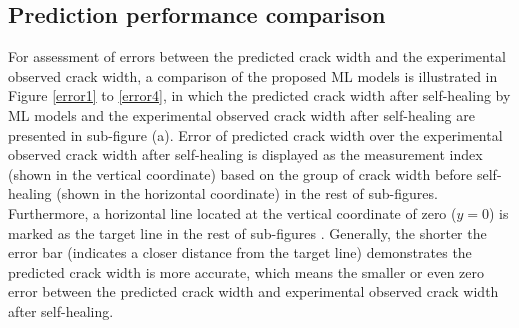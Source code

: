 \documentclass[11pt]{article}
\begin{document}
	
	\subsection{Prediction performance comparison}
For assessment of errors between the predicted crack width and the experimental observed crack width, a comparison of the proposed ML models     is illustrated in Figure \ref{error1} to \ref{error4}, in which the predicted crack width after self-healing by ML models and the experimental observed crack width after self-healing are presented in sub-figure (a). Error of predicted crack width over the experimental observed crack width after self-healing is displayed as the measurement index (shown in the vertical coordinate) based on the group of crack width before self-healing (shown in the horizontal coordinate) in the rest of sub-figures. Furthermore, a horizontal line located at the vertical coordinate of zero ($ y = 0$) is marked as the target line in the rest of sub-figures \cite{alshihri2009neural,yan2017evaluation}. Generally, the shorter the error bar (indicates a closer distance from the target line) demonstrates the predicted crack width is more accurate, which means the smaller or even zero error between the predicted crack width and experimental observed crack width after self-healing.
	
\end{document}
